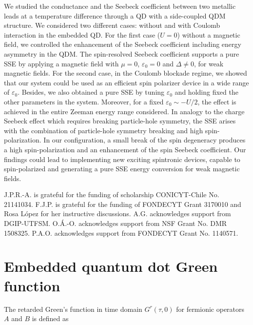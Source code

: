 \documentclass[aps,twocolumn,prb,superscript,floatfix,superscriptaddress,showpacs]{revtex4-1}
\newcommand{\ve}{\varepsilon}
\begin{document}
We studied the conductance and the Seebeck coefficient between two metallic leads at a temperature difference through a QD with a side-coupled QDM structure. We considered two different cases: without and with Coulomb interaction in the embedded QD. For the first case ($U=0$) without a magnetic field, we controlled the enhancement of the Seebeck coefficient including energy asymmetry in the QDM. The spin-resolved Seebeck coefficient supports a pure SSE by applying a magnetic field with $\mu=0$, $\ve_{0}=0$ and $\Delta\neq0$, for weak magnetic fields. For the second case, in the Coulomb blockade regime, we showed that our system could be used as an efficient spin polarizer device in a wide range of $\ve_0$. Besides, we also obtained a pure SSE by tuning $\ve_{0}$ and holding fixed the other parameters in the system. Moreover, for a fixed $\ve_{0}\sim -U/2$, the effect is achieved in the entire Zeeman energy range considered. In analogy to the charge Seebeck effect which requires breaking particle-hole symmetry, the SSE arises with the combination of particle-hole symmetry breaking and high spin-polarization. In our configuration, a small break of the spin degeneracy produces a high spin-polarization and an enhancement of the spin Seebeck coefficient. Our findings could lead to implementing new exciting spintronic devices, capable to spin-polarized and generating a pure SSE energy conversion for weak magnetic fields.\cite{Hamo2016} 

\begin{acknowledgments}
J.P.R.-A. is grateful for the funding of scholarship CONICYT-Chile No. 21141034. F.J.P. is grateful for the funding of FONDECYT Grant 3170010 and Rosa L\'opez for her instructive discussions. A.G. acknowledges support from DGIP-UTFSM. O.\'A.-O. acknowledges support from NSF Grant No. DMR 1508325. P.A.O. acknowledges support from FONDECYT Grant No. 1140571.
\end{acknowledgments}

\appendix

\section{Embedded quantum dot Green function}

The retarded Green's function in time domain $G^{r}\left(\tau,0\right)$ for fermionic operators $A$ and $B$ is defined as
\end{document}
